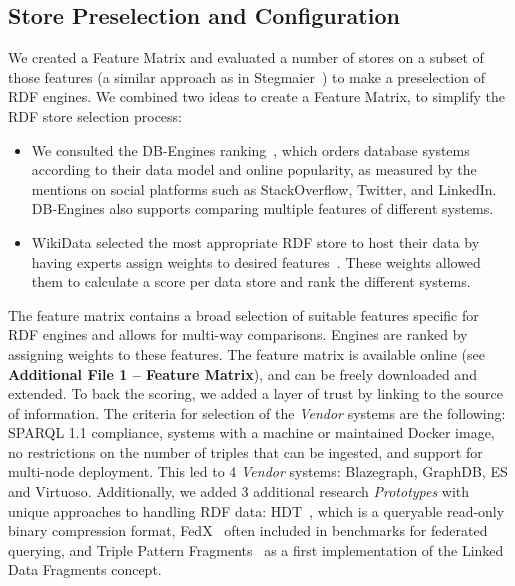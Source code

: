 \documentclass[twocolumn]{bmcart}%
\begin{document}
\subsection{Store Preselection and Configuration}
\label{subsec:featurematrix}
%

We created a Feature Matrix and evaluated a number of stores on a subset of those features (a similar approach as in Stegmaier~\cite{Stegmaier_evaluationof}) to make a preselection of RDF engines.
We combined two ideas to create a Feature Matrix, to simplify the RDF store selection process:
\begin{itemize}
	\item We consulted the DB-Engines ranking~\cite{dbengines}, which orders database systems according to their data model and online popularity, as measured by the mentions on social platforms such as StackOverflow, Twitter, and LinkedIn. 
	DB-Engines also supports comparing multiple features of different systems.
	\item WikiData selected the most appropriate RDF store to host their data by having experts assign weights to desired features~\cite{wikidataranking}.
	These weights allowed them to calculate a score per data store and rank the different systems. 
\end{itemize}

The feature matrix contains a broad selection of suitable features specific for RDF engines and allows for multi-way comparisons. Engines are ranked by assigning weights to these features. 
The feature matrix is available online (see \textbf{Additional File 1 -- Feature Matrix}), and can be freely downloaded and extended. To back the scoring, we added a layer of trust by linking to the source of information.
The criteria for selection of the \emph{Vendor} systems are the following:
SPARQL 1.1 compliance, systems with a machine or maintained Docker image, no restrictions on the number of triples that can be ingested, and support for multi-node deployment.
This led to 4 \emph{Vendor} systems: Blazegraph, GraphDB, ES and Virtuoso.
Additionally, we added 3 additional research \emph{Prototypes} with unique approaches to handling RDF data: HDT~\cite{DBLP:journals/ws/FernandezMGPA13}, which is a queryable read-only binary compression format, FedX~\cite{DBLP:conf/semweb/SchwarteHHSS11} often included in benchmarks for federated querying, and Triple Pattern Fragments~\cite{DBLP:conf/semweb/VerborghHMHVSCCMW14} as a first implementation of the Linked Data Fragments concept.
\end{document}
